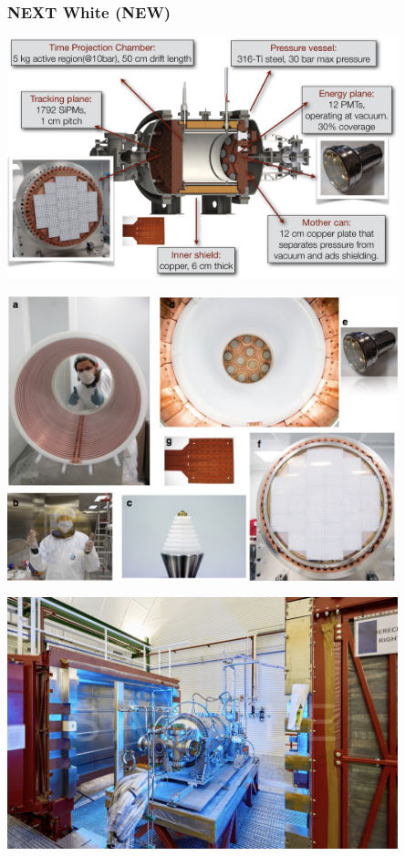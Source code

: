 \begin{frame}
\frametitle{NEXT White (NEW)} 

 \begin{center}
\includegraphics[width=0.85\textwidth]{moriond/next-white-drawing.png}
\end{center}
\end{frame}

\begin{frame}
 \begin{center}
\includegraphics[width=0.85\textwidth]{moriond/next-parts.png}
\end{center}
\end{frame}

\begin{frame}
 \begin{center}
\includegraphics[width=0.85\textwidth]{moriond/next-white.png}
\end{center}
\end{frame}

